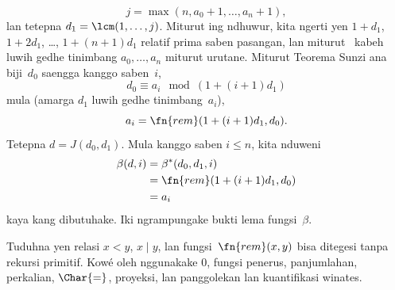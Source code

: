 \documentclass[../../../include/open-logic-section]{subfiles}
\begin{document}
\[
j = \max(n,a_0+1,\dots,a_n+1),
\]
lan tetepna $d_1 = \lcm(1,\dots,j)$. Miturut  ing ndhuwur,
kita ngerti yen $1+d_1$, $1+2 d_1$, \dots, $1+(n+1) d_1$ relatif prima
saben pasangan, lan miturut~ kabeh luwih gedhe tinimbang
$a_0,\dots,a_n$ miturut urutane. Miturut Teorema Sunzi ana biji~$d_0$
saengga kanggo saben~$i$,
\[
d_0 \equiv a_i \mod (1+(i+1)d_1)
\]
mula (amarga $d_1$ luwih gedhe tinimbang~$a_i$),
\[
a_i = \fn{rem}(1+(i+1)d_1,d_0).
\]
Tetepna $d = J(d_0,d_1)$. Mula kanggo saben $i \le n$, kita nduweni
\begin{align*}
\beta(d,i) & =  \beta^*(d_0,d_1,i) \\
& =  \fn{rem}(1+(i+1) d_1,d_0) \\
& =  a_i
\end{align*}
kaya kang dibutuhake. Iki ngrampungake bukti lema
fungsi~$\beta$.

\begin{prob}
  Tuduhna yen relasi $x < y$, $x \mid y$, lan
  fungsi~$\fn{rem}(x,y)$ bisa ditegesi tanpa rekursi primitif.
  Kowé oleh nggunakake $0$, fungsi penerus, panjumlahan, perkalian,
  $\Char{=}$, proyeksi, lan panggolekan lan kuantifikasi winates.
\end{prob}
\end{document}
